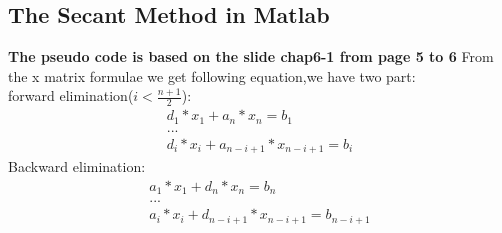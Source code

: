 \subsection{The Secant Method in Matlab}
\textbf{The pseudo code is based on the slide chap6-1 from page 5 to 6}
From the x matrix formulae we get following equation,we have two part:\\
forward elimination($i<\frac{n+1}{2}$):
\begin{align*}
    d_1*x_1+a_n*x_n=b_1\\
... \\
d_i*x_i+a_{n-i+1}*x_{n-i+1}=b_i
\end{align*}
Backward elimination:
\begin{align*}
    a_1*x_1+d_n*x_n=b_n\\
    ...\\
    a_i*x_i+d_{n-i+1}*x_{n-i+1}=b_{n-i+1}
\end{align*}
